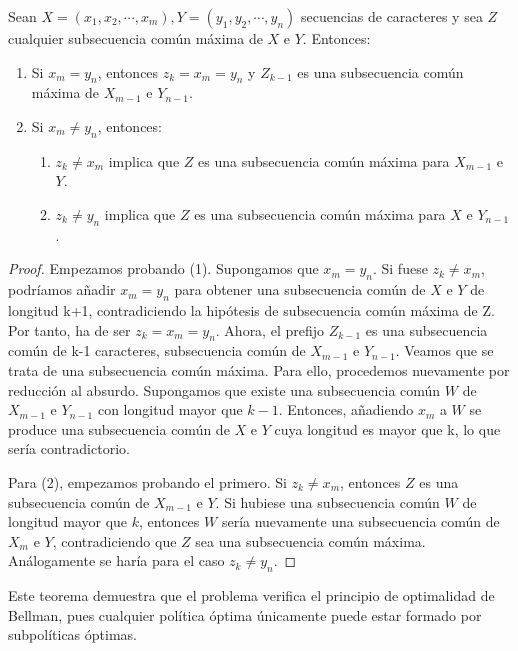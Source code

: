 \begin{theorem}
    Sean $X=(x_1,x_2,\cdots, x_m),Y=(y_1,y_2, \cdots, y_n)$ secuencias de caracteres 
    y sea $Z$ cualquier subsecuencia común máxima 
    de $X$ e $Y$. Entonces:
    \begin{enumerate}
      \item Si $x_m = y_n$, entonces $z_k = x_m = y_n$ y $Z_{k-1}$ es una subsecuencia
      común máxima de $X_{m-1}$ e $Y_{n-1}$. 
      \item Si $x_m \neq y_n$, entonces:
      \begin{enumerate}
        \item $z_k \neq x_m$ implica que $Z$ es una subsecuencia común máxima para $X_{m-1}$ e $Y$. 
        \item $z_k \neq y_n$ implica que $Z$ es una subsecuencia común máxima para $X$ e $Y_{n-1}$. 
      \end{enumerate}
    \end{enumerate}
\end{theorem}

\begin{proof}
  Empezamos probando (1). Supongamos que $x_m = y_n$. Si fuese $z_k \neq x_m$,
  podríamos añadir $x_m = y_n$ para obtener una subsecuencia común de $X$ e $Y$ 
  de longitud k+1, contradiciendo la hipótesis de subsecuencia común máxima de Z. 
  Por tanto, ha de ser $z_k = x_m = y_n$. Ahora, el prefijo $Z_{k-1}$ es una
  subsecuencia común de k-1 caracteres, subsecuencia común de $X_{m-1}$ e $Y_{n-1}$.
  Veamos que se trata de una subsecuencia común máxima. Para ello, procedemos
  nuevamente por reducción al absurdo. Supongamos que existe una subsecuencia común $W$ de
  $X_{m-1}$ e $Y_{n-1}$ con longitud mayor que $k-1$. Entonces, añadiendo $x_m$ a $W$
  se produce una subsecuencia común de $X$ e $Y$ cuya longitud es mayor que k, lo
  que sería contradictorio.

  Para (2), empezamos probando el primero. Si $z_k \neq x_m$, entonces $Z$ es una
  subsecuencia común de $X_{m-1}$ e $Y$. Si hubiese una subsecuencia común $W$
  de longitud mayor que $k$, entonces $W$ sería nuevamente una subsecuencia común 
  de $X_m$ e $Y$, contradiciendo que $Z$ sea una subsecuencia común máxima.
  Análogamente se haría para el caso $z_k \neq y_n$. 
\end{proof}

Este teorema demuestra que el problema verifica el principio de optimalidad de
Bellman, pues cualquier política óptima únicamente puede estar formado por
subpolíticas óptimas. 

